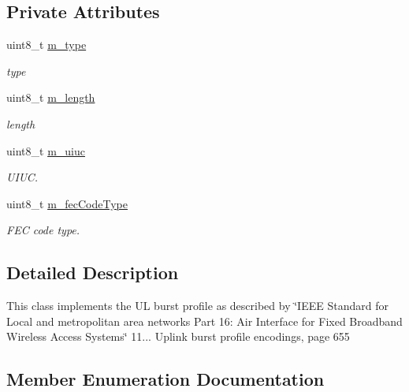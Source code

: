 \subsection*{Private Attributes}
\begin{DoxyCompactItemize}
\item 
uint8\+\_\+t \hyperlink{classns3_1_1OfdmUlBurstProfile_a3310244574658f1dc41aba964c5d1c31}{m\+\_\+type}
\begin{DoxyCompactList}\small\item\em type \end{DoxyCompactList}\item 
uint8\+\_\+t \hyperlink{classns3_1_1OfdmUlBurstProfile_a08cc4689ce7ac290c9c5b7ccf3814031}{m\+\_\+length}
\begin{DoxyCompactList}\small\item\em length \end{DoxyCompactList}\item 
uint8\+\_\+t \hyperlink{classns3_1_1OfdmUlBurstProfile_a30a8c14666e0bc78126bcb6a57acd102}{m\+\_\+uiuc}
\begin{DoxyCompactList}\small\item\em U\+I\+UC. \end{DoxyCompactList}\item 
uint8\+\_\+t \hyperlink{classns3_1_1OfdmUlBurstProfile_ae500c755ce6140558cefb540e6107bfa}{m\+\_\+fec\+Code\+Type}
\begin{DoxyCompactList}\small\item\em F\+EC code type. \end{DoxyCompactList}\end{DoxyCompactItemize}


\subsection{Detailed Description}
This class implements the UL burst profile as described by \char`\"{}\+I\+E\+E\+E Standard for
\+Local and metropolitan area networks Part 16\+: Air Interface for Fixed Broadband Wireless Access Systems\char`\"{} 11... Uplink burst profile encodings, page 655 

\subsection{Member Enumeration Documentation}
